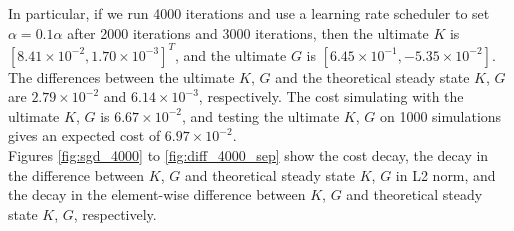 \documentclass{article}
\begin{document}
\noindent In particular, if we run 4000 iterations and use a learning rate scheduler to set $\alpha = 0.1\alpha$ after 2000 iterations and 3000 iterations, then the ultimate $K$ is $[8.41\times 10^{-2}, 1.70\times 10^{-3}]^T$, and the ultimate $G$ is $[6.45\times 10^{-1}, -5.35\times 10^{-2}]$. The differences between the ultimate $K$, $G$ and the theoretical steady state $K$, $G$ are $2.79\times 10^{-2}$ and $6.14\times 10^{-3}$, respectively. The cost simulating with the ultimate $K$, $G$ is $6.67\times 10^{-2}$, and testing the ultimate $K$, $G$ on 1000 simulations gives an expected cost of $6.97\times 10^{-2}$.\\
Figures \ref{fig:sgd_4000} to \ref{fig:diff_4000_sep} show the cost decay, the decay in the difference between $K$, $G$ and theoretical steady state $K$, $G$ in L2 norm, and the decay in the element-wise difference between $K$, $G$ and theoretical steady state $K$, $G$, respectively. \\
\end{document}
